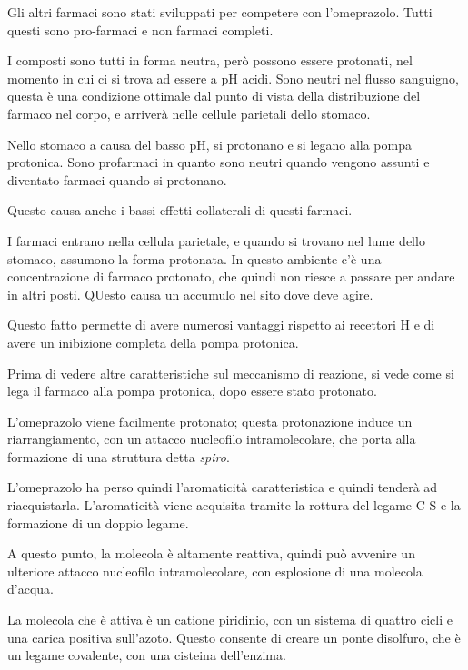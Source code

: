 Gli altri farmaci sono stati sviluppati per competere con l'omeprazolo.
Tutti questi sono pro-farmaci e non farmaci completi.

I composti sono tutti in forma neutra, però possono essere protonati, nel
momento in cui ci si trova ad essere a pH acidi. Sono neutri nel flusso
sanguigno, questa è una condizione ottimale dal punto di vista della
distribuzione del farmaco nel corpo, e arriverà nelle cellule parietali
dello stomaco.

Nello stomaco a causa del basso pH, si protonano e si legano alla pompa
protonica. Sono profarmaci in quanto sono neutri quando vengono assunti
e diventato farmaci quando si protonano.

Questo causa anche i bassi effetti collaterali di questi farmaci.

I farmaci entrano nella cellula parietale, e quando si trovano nel lume
dello stomaco, assumono la forma protonata. In questo ambiente c'è una
concentrazione di farmaco protonato, che quindi non riesce a passare per
andare in altri posti. QUesto causa un accumulo nel sito dove deve
agire.

Questo fatto permette di avere numerosi vantaggi rispetto ai recettori
H e di avere un inibizione completa della pompa protonica.

Prima di vedere altre caratteristiche sul meccanismo di reazione, si
vede come si lega il farmaco alla pompa protonica, dopo essere stato
protonato.


L'omeprazolo viene facilmente protonato; questa protonazione induce un
riarrangiamento, con un attacco nucleofilo intramolecolare, che porta
alla formazione di una struttura detta \emph{spiro}.

L'omeprazolo ha perso quindi l'aromaticità caratteristica e quindi
tenderà ad riacquistarla. L'aromaticità viene acquisita tramite la
rottura del legame C-S e la formazione di un doppio legame.

A questo punto, la molecola è altamente reattiva, quindi può avvenire un
ulteriore attacco nucleofilo intramolecolare, con esplosione di una
molecola d'acqua.

La molecola che è attiva è un catione piridinio, con un sistema di
quattro cicli e una carica positiva sull'azoto. Questo consente di
creare un ponte disolfuro, che è un legame covalente, con una cisteina
dell'enzima.


